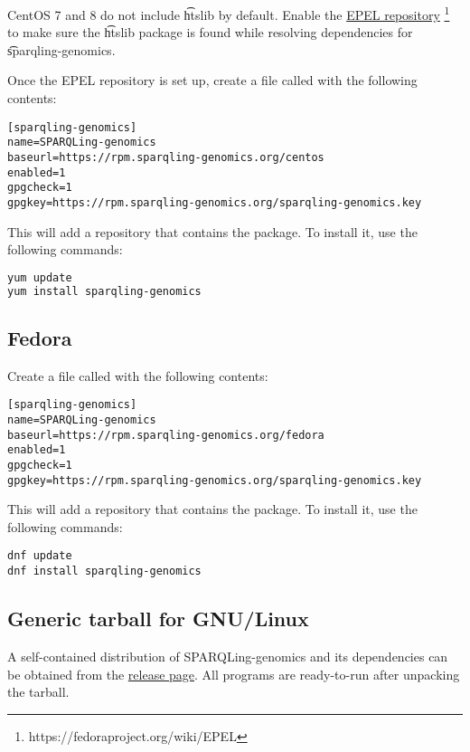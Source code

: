   CentOS 7 and 8 do not include \t{htslib} by default.  Enable the
  \href{https://fedoraproject.org/wiki/EPEL}{EPEL repository}%
  \footnote{https://fedoraproject.org/wiki/EPEL} to make sure the
  \t{htslib} package is found while resolving dependencies for
  \t{sparqling-genomics}.

  Once the EPEL repository is set up, create a file called
   with the following contents:

\begin{lstlisting}
[sparqling-genomics]
name=SPARQLing-genomics
baseurl=https://rpm.sparqling-genomics.org/centos
enabled=1
gpgcheck=1
gpgkey=https://rpm.sparqling-genomics.org/sparqling-genomics.key
\end{lstlisting}

This will add a repository that contains the  package.
To install it, use the following commands:

\begin{lstlisting}[language=bash]
yum update
yum install sparqling-genomics
\end{lstlisting}

\subsection{Fedora}

Create a file called 
with the following contents:

\begin{lstlisting}
[sparqling-genomics]
name=SPARQLing-genomics
baseurl=https://rpm.sparqling-genomics.org/fedora
enabled=1
gpgcheck=1
gpgkey=https://rpm.sparqling-genomics.org/sparqling-genomics.key
\end{lstlisting}

This will add a repository that contains the  package.
To install it, use the following commands:

\begin{lstlisting}
dnf update
dnf install sparqling-genomics
\end{lstlisting}

\subsection{Generic tarball for GNU/Linux}

  A self-contained distribution of SPARQLing-genomics and its dependencies
  can be obtained from the \href{https://github.com/UMCUGenetics/sparqling-genomics/releases}%
  {release page}.  All programs are ready-to-run after unpacking the tarball.


